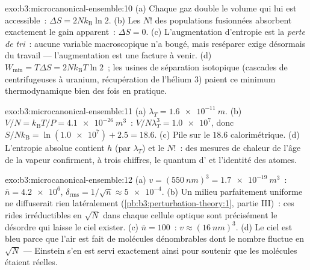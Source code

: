 \begin{solution}{exo:b3:microcanonical-ensemble:10}
(a) Chaque gaz double le volume qui lui est accessible~: $\Delta S =
2Nk_{\text{B}}\ln2$. (b) Les $N!$ des populations fusionnées
absorbent exactement le gain apparent~: $\Delta S = 0$. (c)
L'augmentation d'entropie est la \emph{perte de tri}~: aucune
variable macroscopique n'a bougé, mais reséparer exige désormais du
travail --- l'augmentation est une facture à venir. (d) $W_{\min} = T\Delta S =
2Nk_{\text{B}}T\ln2$~; les usines de
séparation isotopique (cascades de centrifugeuses à uranium,
récupération de l'hélium 3) paient ce minimum thermodynamique bien
des fois en pratique.
\end{solution}

\begin{solution}{exo:b3:microcanonical-ensemble:11}
(a) $\lambda_T = \qty{1.6e-11}{m}$. (b) $V/N = k_{\text{B}}T/P =
\qty{4.1e-26}{m^3}$~: $V/N\lambda_T^3 = \num{1.0e7}$, donc
$S/Nk_{\text{B}} = \ln(\num{1.0e7}) + 2.5 = 18.6$. (c) Pile sur le
$18.6$ calorimétrique. (d) L'entropie absolue contient $h$ (par
$\lambda_T$) et le $N!$~: des mesures de chaleur de l'âge de la vapeur
confirment, à trois chiffres, le quantum d' et l'identité des
atomes.
\end{solution}

\begin{solution}{exo:b3:microcanonical-ensemble:12}
(a) $v = (\qty{550}{nm})^3 = \qty{1.7e-19}{m^3}$~: $\bar n =
\num{4.2e6}$, $\delta_{\text{rms}} = 1/\sqrt{\bar n} \approx
\num{5e-4}$. (b) Un milieu parfaitement uniforme ne diffuserait rien
latéralement (\cref{pb:b3:perturbation-theory:1}, partie III)~: ces
rides irréductibles en $\sqrt N$ dans chaque cellule optique sont
précisément le désordre qui laisse le ciel exister. (c) $\bar n = 100$~: $v
\approx (\qty{16}{nm})^3$. (d) Le ciel est bleu parce que l'air est
fait de molécules dénombrables dont le nombre fluctue en $\sqrt N$ ---
Einstein s'en est servi exactement ainsi pour soutenir que les
molécules étaient réelles.
\end{solution}

